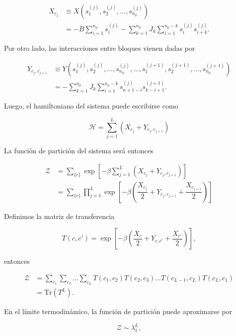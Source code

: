 \documentclass[10pt]{article}
\begin{document}
\begin{align*}
X_{c_j} &\equiv X( s_1^{(j)}, s_2^{(j)},\dots ,s_{n_0}^{(j)}) \\
&= -B\sum_{i=1}^{n_0} s_i^{(j)} - \sum_{k=1}^{n_0} J_k \sum_{i=1}^{n_0-k} s_i^{(j)} s_{i+k}^{(j)}.
\end{align*}

Por otro lado, las interacciones entre bloques vienen dadas por 


\begin{align*}
Y_{c_j, c_{j+1}} &\equiv Y( s_1^{(j)}, s_2^{(j)},\dots ,s_{n_0}^{(j)},\dots , s_1^{(j+1)}, s_2^{(j+1)},\dots ,s_{n_0}^{(j+1)}) \\
&= - \sum_{k=1}^{n_0} J_k \sum_{i=1}^{n_0-k} s_{n+1-i}^{(j)} s_{k-i+1}^{(j+1)}.
\end{align*}

Luego, el hamiltoniano del sistema puede escribirse como

\begin{equation}
\mathcal{H} = \sum_{j=1}^{L} \left(X_{c_j} + Y_{c_j, c_{j+1}}\right)
\end{equation}

La funci\'on de partici\'on del sistema ser\'a entonces 

\begin{align}
\mathcal{Z} &= \sum_{\lbrace c\rbrace} \exp \left[ -\beta \sum_{j=1}^{L} \left(X_{c_j} + Y_{c_j, c_{j+1}}\right) \right] \nonumber \\
&=  \sum_{\lbrace c\rbrace} \prod_{j=1}^L \exp \left[ -\beta\left( \dfrac{X_{c_j}}{2} + Y_{c_j, c_{j+1}} + \dfrac{X_{c_{j+1}}}{2}\right) \right]
\end{align}

Definimos la matriz de transferencia 

\begin{equation}
T(c,c') = \exp \left[ -\beta \left(\dfrac{X_{c}}{2} + Y_{c, c'} + \dfrac{X_{c'}}{2}\right) \right],
\end{equation}

entonces

\begin{align}
\mathcal{Z} &= \sum_{c_1} \sum_{c_2}\dots\sum_{c_L} T(c_1,c_2) T(c_2,c_3)\dots T(c_{L-1},c_L) T(c_L,c_1)\nonumber \\
&= \text{Tr} (T^L).
\end{align}

En el l\'imite termodin\'amico, la funci\'on de partici\'on puede aproximarse por 

\begin{equation}
\mathcal{Z} \sim \lambda_1^L, 
\end{equation}
\end{document}
